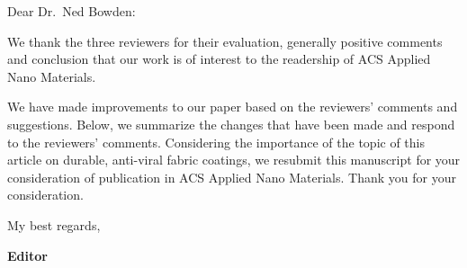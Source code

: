 \documentclass[12pt]{letter}
\date{\today}
\begin{document}
\begin{letter}{}

\opening{Dear Dr.~Ned Bowden:}


We thank the three reviewers for their evaluation, generally positive comments and conclusion that our work is of interest 
to the readership of ACS Applied Nano Materials.


We have made improvements to our paper based on the reviewers' comments and suggestions.
Below, we summarize the changes that have been made and respond to the reviewers' comments.
Considering the importance of the topic of this
article on 
durable, anti-viral fabric coatings,
we resubmit this manuscript for your consideration of publication in ACS Applied Nano Materials.
Thank you for your consideration.

\closing{My best regards,}




\end{letter}



\newpage

\textbf{Editor}
\end{document}
